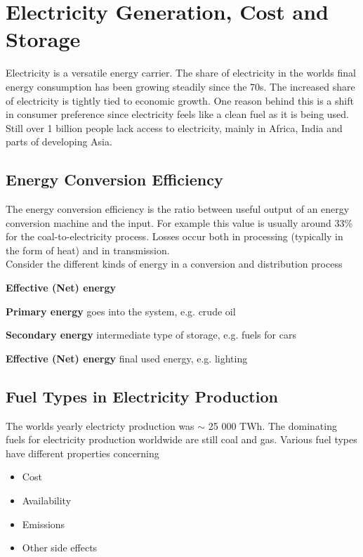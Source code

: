 \section{Electricity Generation, Cost and Storage}

Electricity is a versatile energy carrier.
The share of electricity in the worlds final energy consumption has been growing steadily since the 70s.
The increased share of electricity is tightly tied to economic growth.
One reason behind this is a shift in consumer preference since electricity feels like a clean fuel as it is being used.
Still over 1 billion people lack access to electricity, mainly in Africa, India and parts of developing Asia.

\subsection{Energy Conversion Efficiency}
The energy conversion efficiency is the ratio between useful output of an energy conversion machine and the input.
For example this value is usually around 33\% for the coal-to-electricity process.
Losses occur both in processing (typically in the form of heat) and in transmission.\\

Consider the different kinds of energy in a conversion and distribution process

\begin{labeling}{\textbf{Effective (Net) energy}}
    \item [\textbf{Primary energy}] goes into the system, e.g. crude oil
    \item [\textbf{Secondary energy}] intermediate type of storage, e.g. fuels for cars
    \item [\textbf{Effective (Net) energy}] final used energy, e.g. lighting
\end{labeling}

\subsection{Fuel Types in Electricity Production}

The worlds yearly electricty production was $\sim$ 25 000 TWh.
The dominating fuels for electricity production worldwide are still coal and gas.
Various fuel types have different properties concerning

\begin{itemize}
    \item Cost
    \item Availability
    \item Emissions
    \item Other side effects
\end{itemize}

